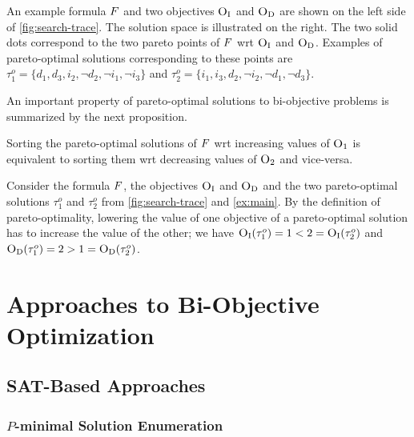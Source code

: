 \begin{example}\label{ex:main}
An example formula $F$ and two objectives $\textsc{O}_{\text{I}}$ and $\textsc{O}_{\text{D}}$ are shown on the left side of \cref{fig:search-trace}. 
The solution space is illustrated on the right.
The two solid dots correspond to the two pareto points of $F$ wrt $\textsc{O}_{\text{I}}$ and $\textsc{O}_{\text{D}}$. 
Examples of pareto-optimal solutions corresponding to these points are $\tau^o_1 = \{d_1, d_3, i_2, \lnot d_2, \lnot i_1, \lnot i_3\}$ and 
$\tau^o_2 = \{i_1, i_3, d_2, \lnot i_2, \lnot d_1, \lnot d_3\}$.
\end{example}

An important property 
of pareto-optimal solutions to bi-objective problems is summarized by the next proposition.

\begin{proposition}
\label{prop:biobjective}
Sorting the pareto-optimal solutions of $F$
wrt increasing values of $\textsc{O}_1$ is equivalent to sorting them wrt decreasing values of 
$\textsc{O}_2$ and vice-versa. %
\end{proposition}

\begin{example}
Consider the formula $F$, the objectives $\textsc{O}_{\text{I}}$ and $\textsc{O}_{\text{D}}$ and the two pareto-optimal solutions $\tau^o_1$ and $\tau^o_2$ from \cref{fig:search-trace} and \cref{ex:main}.
By the definition of pareto-optimality, lowering the value of one objective of a pareto-optimal solution has to increase the value of the other;
we have  $\textsc{O}_{\text{I}}(\tau^o_1) = 1 < 2 = \textsc{O}_{\text{I}}(\tau^o_2)$ and $\textsc{O}_{\text{D}}(\tau^o_1) = 2 > 1 = \textsc{O}_{\text{D}}(\tau^o_2)$.
\end{example}

\section{Approaches to Bi-Objective Optimization\label{sec:approaches}}


\subsection{SAT-Based Approaches\label{sec:sat-based}}

\subsubsection{$P$-minimal Solution Enumeration\label{sec:p-minimal}}


